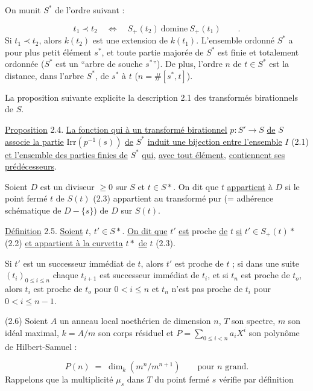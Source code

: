 On munit $S^*$ de l'ordre suivant :

\begin{equation*}
t_1 \prec t_2 \quad \Longleftrightarrow \quad S_+(t_2) \ \mbox{domine} \ S_+(t_1) \qquad .
\end{equation*}
Si $t_1 \prec t_2$, alors $k(t_2)$ est une extension de $k(t_1)$. L'ensemble ordonné $S^*$ a pour plus petit élément $s^*$, et toute partie majorée de $S^*$ est finie et totalement ordonnée ($S^*$ est un ``arbre de souche $s^*$''). De plus, l'ordre $n$ de $t \in S^*$ est la distance, dans l'arbre $S^*$, de $s^*$ à $t$ ($n = \#[s^*,t]$).

La proposition suivante explicite la description 2.1 des transformés birationnels de $S$.

\underline{Proposition} 2.4. \underline{La fonction qui à un transformé birationnel} $p : S' \to S$ \underline{de} $S$ \underline{associe la partie} $\mathrm{Irr}(p^{-1}(s))$ \underline{de} $S^*$ \underline{induit une bijection entre l'ensemble} $I$ (2.1) \underline{et l'ensemble des parties finies de} $S^*$ \underline{qui}, \underline{avec tout élément},
\underline{contiennent ses prédécesseurs}.

Soient $D$ est un diviseur $\geq 0$ sur $S$ et $t \in S*$. On dit que $t$ \underline{appartient} à $D$ si le point fermé $t$ de $S(t)$ (2.3) appartient au transformé pur (= adhérence schématique de $D - \{s\}$) de $D$ sur $S(t)$.

\underline{Définition} 2.5. \underline{Soient} $t$, $t' \in S*$. \underline{On dit que} $t'$ \underline{est} proche \underline{de} $t$ \underline{si} $t' \in S_+(t)*$ (2.2) \underline{et appartient à la curvetta} $t*$ \underline{de} $t$ (2.3).

Si $t'$ est un successeur immédiat de $t$, alors $t'$ est proche de $t$ ; si dans une suite $(t_i)_{0 \leq i \leq n}$ chaque $t_{i+1}$ est successeur immédiat de $t_i$, et si $t_n$ est proche de $t_o$, alors $t_i$ est proche de $t_o$ pour $0 < i \leq n$ et $t_n$ n'est pas proche de $t_i$ pour $0 < i \leq n-1$.

(2.6)  Soient $A$ un anneau local noethérien de dimension $n$, $T$ son spectre, $m$ son idéal maximal, $k = A/m$ son corps résiduel et $P = \sum_{0 \leq i < n} a_i X^i$ son polynôme de Hilbert-Samuel :

\begin{equation*}
P(n) \;=\; \dim_k(m^n/m^{n+1}) \qquad \text{pour } n \text{ grand.}
\end{equation*}
Rappelons que la multiplicité $\mu_s$ dans $T$ du point fermé $s$ vérifie par définition

